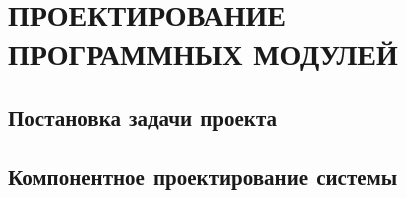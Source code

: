 \section{ПРОЕКТИРОВАНИЕ ПРОГРАММНЫХ МОДУЛЕЙ}
\label{sec:theory}

\subsection{Постановка задачи проекта}
\label{sub:theory:goals}


\subsection{Компонентное проектирование системы}
\label{sub:theory:components}
